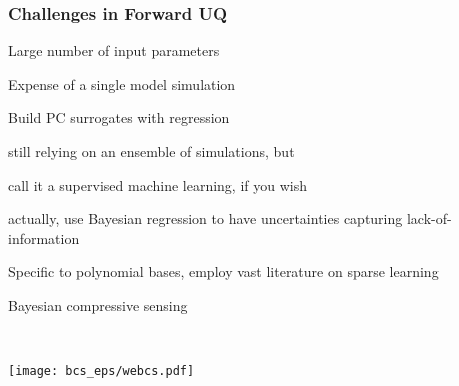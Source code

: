 
\begin{frame}[t]
\label{challenge-fUQ-hiD}
\frametitle{Challenges in Forward UQ}

\bi
\item Large number of input parameters
\item Expense of a single model simulation
\ei

\bi
\item Build PC surrogates with regression
\bi
\item still relying on an ensemble of simulations, but
\item call it a supervised machine learning, if you wish
\item actually, use Bayesian regression to have uncertainties capturing lack-of-information
\ei
\item Specific to polynomial bases, employ vast literature on sparse learning 
\bi
\item Bayesian compressive sensing 
\ei
\ei

\\
\medskip
{}

\vspace*{-1.7cm}
\hspace*{8cm}
\texttt{[image: bcs\_eps/webcs.pdf]}


\end{frame}
